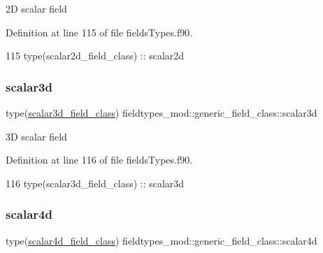 2D scalar field 



Definition at line 115 of file fields\+Types.\+f90.


\begin{DoxyCode}
115         \textcolor{keywordtype}{type}(scalar2d\_field\_class) :: scalar2d
\end{DoxyCode}
\mbox{\label{structfieldtypes__mod_1_1generic__field__class_a8ffce3cc5f44742a29d0d9815301f218}} 
\subsubsection{\texorpdfstring{scalar3d}{scalar3d}}
{\footnotesize\ttfamily type(\mbox{\hyperlink{structfieldtypes__mod_1_1scalar3d__field__class}{scalar3d\+\_\+field\+\_\+class}}) fieldtypes\+\_\+mod\+::generic\+\_\+field\+\_\+class\+::scalar3d\hspace{0.3cm}{\ttfamily [private]}}



3D scalar field 



Definition at line 116 of file fields\+Types.\+f90.


\begin{DoxyCode}
116         \textcolor{keywordtype}{type}(scalar3d\_field\_class) :: scalar3d
\end{DoxyCode}
\mbox{\label{structfieldtypes__mod_1_1generic__field__class_a9e48e8cd99ca98d4d8dd1f40f9002899}} 
\subsubsection{\texorpdfstring{scalar4d}{scalar4d}}
{\footnotesize\ttfamily type(\mbox{\hyperlink{structfieldtypes__mod_1_1scalar4d__field__class}{scalar4d\+\_\+field\+\_\+class}}) fieldtypes\+\_\+mod\+::generic\+\_\+field\+\_\+class\+::scalar4d\hspace{0.3cm}{\ttfamily [private]}}



